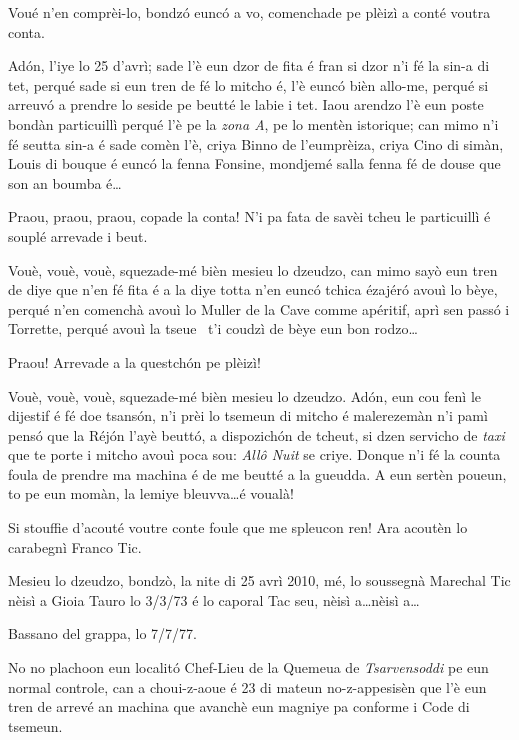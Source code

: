\begin{drama}
\DzeudzoSenliquerspeaks Voué n’en comprèi-lo, bondzó eunc\'o a vo, comenchade pe plèizì a conté voutra conta.

\Cienspeaks Adón, l'iye lo 25 d’avrì; sade l'è eun dzor de fita é fran si dzor n’i fé la sin-a di tet, perqué sade si eun tren de fé lo mi\-tcho é, l’è euncó bièn allo-me, perqué si arreuv\'o a prendre lo seside pe beutté le labie i tet. Iaou arendzo l’è eun poste bondàn particuillì perqué l’è pe la \textit{zona A}, pe lo mentèn istorique; can mimo n’i fé seutta sin-a é sade comèn l’è, criya Binno de l'eumprèiza, criya Cino di simàn, Louis di bouque é euncó la fenna Fonsine, mon\-djemé salla fenna fé de douse que son an boumba é\ldots

\DzeudzoSenliquerspeaks {} Praou, praou, praou, copade la conta! N’i pa fata de savèi tcheu le particuillì é souplé arrevade i beut.

\Cienspeaks Vouè, vouè, vouè, squezade-mé bièn mesieu lo dzeu\-dzo, can mimo sayò eun tren de diye que n’en fé fita é a la diye totta n’en eunc\'o tchica ézajéró avouì lo bèye, perqué n’en comenchà avouì lo Muller de la Cave comme apéritif, aprì sen passó i Torrette, perqué avouì la tseue \carne\ t’i coudzì de bèye eun bon rodzo\ldots

\DzeudzoSenliquerspeaks Praou! Arrevade a la questchón pe plèizì!

\Cienspeaks Vouè, vouè, vouè, squezade-mé bièn mesieu lo dzeu\-dzo. Adón, eun cou fenì le dijestif é fé doe tsansón, n’i prèi lo tsemeun di mitcho é malerezemàn n’i pamì pensó que la Réjón l’ayè beuttó, a dispozichón de tcheut, si dzen servicho de \textit{taxi} que te porte i mitcho avouì poca sou: \textit{Allô Nuit} se criye. Donque n’i fé la counta foula de prendre ma machina é de me beutté a la gueudda. A eun sertèn poueun, to pe eun momàn, la lemiye bleuvva\ldots é voualà!

\DzeudzoSenliquerspeaks  Si stouffie d'acouté voutre conte foule que me spleucon ren! Ara acoutèn lo carabegnì Franco Tic.


\Ticspeaks Mesieu lo dzeudzo, bondzò, la nite di 25 avrì 2010, mé, lo soussegnà Marechal Tic nèisì a Gioia Tauro lo 3/3/73 é lo caporal Tac seu, nèisì a\ldots nèisì a\ldots

\Tacspeaks Bassano del grappa,  lo 7/7/77.

\Ticspeaks  No no plachoon eun localitó Chef-Lieu de la Quemeua de \textit{Tsarvensoddi} pe eun normal controle, can a choui-z-aoue é 23 di mateun no-z-appesisèn que l’è eun tren de arrevé an machina que avanchè eun magniye pa conforme i Code di tsemeun. 


\end{drama}
